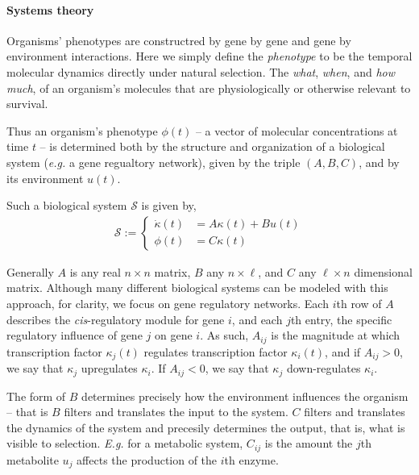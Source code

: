 \documentclass{article}
\newcommand{\1}{\mathbbm{1}}
\begin{document}
\paragraph{Systems theory}
Organisms' phenotypes are constructred by gene by gene and gene by environment interactions. Here we simply define the \emph{phenotype} to be the temporal molecular dynamics directly under natural selection. The \emph{what}, \emph{when}, and \emph{how much}, of an organism's molecules that are physiologically or otherwise relevant to survival.

Thus an organism's phenotype $\phi(t)$ -- a vector of molecular concentrations at time $t$ -- is determined both by the structure and organization of a biological system (\emph{e.g.} a gene regualtory network), given by the triple $(A,B,C)$,
and by its environment $u(t)$.

Such a biological system $\mathcal{S}$ is given by,
  \begin{align}\label{eqn:system}
    \mathcal{S} := \left\{ \begin{array}{ll} \dot{\kappa}(t) &= A \kappa(t) + B u(t) \\ \phi(t) &= C \kappa(t) \end{array} \right.
  \end{align}

Generally $A$ is any real $n \times n$ matrix, $B$ any $n \times \ell$, and $C$ any $\ell \times n$ dimensional matrix. Although many different biological systems can be modeled with this approach, for clarity, we focus on gene regulatory networks.
%
Each $i$th row of $A$ describes the \emph{cis}-regulatory module for gene $i$, and each $j$th entry, the specific regulatory influence of gene $j$ on gene $i$. 
%
As such, $A_{ij}$ is the magnitude at which transcription factor $\kappa_j(t)$ regulates transcription factor $\kappa_i(t)$, and if $A_{ij} > 0$, we say that $\kappa_j$ upregulates $\kappa_i$. If $A_{ij} < 0$, we say that $\kappa_j$ down-regulates $\kappa_i$. 

The form of $B$ determines precisely how the environment influences the organism -- that is $B$ filters and translates the input to the system. $C$ filters and translates the dynamics of the system and precesily determines the output, that is, what is visible to selection.
\emph{E.g.} for a metabolic system, $C_{ij}$ is the amount the $j$th metabolite $u_j$ affects the production of the $i$th enzyme.
%
\end{document}

